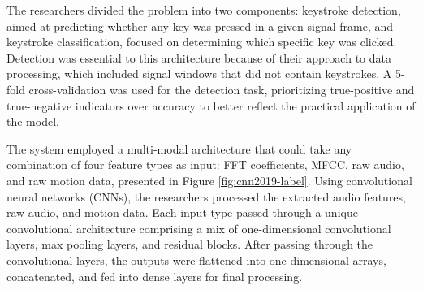 \documentclass[a4paper,11pt,twoside]{report}
\theoremstyle{definition}
\begin{document}
The researchers divided the problem into two components: keystroke detection, aimed at predicting whether any key was pressed in a given signal frame, and keystroke classification, focused on determining which specific key was clicked. Detection was essential to this architecture because of their approach to data processing, which included signal windows that did not contain keystrokes. A 5-fold cross-validation was used for the detection task, prioritizing true-positive and true-negative indicators over accuracy to better reflect the practical application of the model.

The system employed a multi-modal architecture that could take any combination of four feature types as input: FFT coefficients, MFCC, raw audio, and raw motion data, presented in Figure \ref{fig:cnn2019-label}. Using convolutional neural networks (CNNs), the researchers processed the extracted audio features, raw audio, and motion data. Each input type passed through a unique convolutional architecture comprising a mix of one-dimensional convolutional layers, max pooling layers, and residual blocks. After passing through the convolutional layers, the outputs were flattened into one-dimensional arrays, concatenated, and fed into dense layers for final processing.
\end{document}

